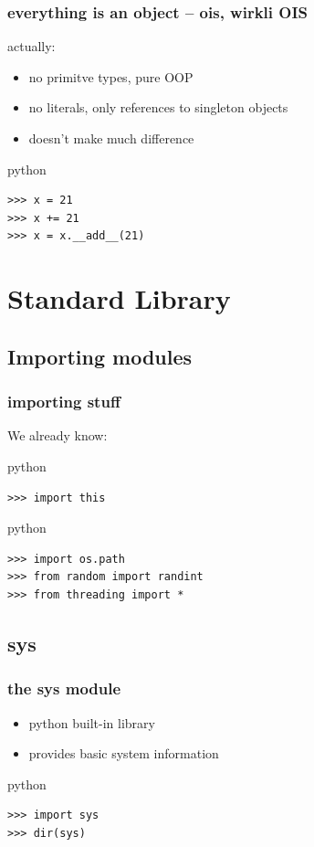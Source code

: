 \documentclass{beamer}
\begin{document}
\begin{frame}[fragile]
	\frametitle{everything is an object -- ois, wirkli OIS}
	actually:
	\begin{itemize}
	\item no primitve types, pure OOP
	\item no literals, only references to singleton objects
	\item doesn't make much difference
	\end{itemize}
	\begin{exampleblock}{python}
	\begin{lstlisting}
>>> x = 21
>>> x += 21
>>> x = x.__add__(21)
	\end{lstlisting}
	\end{exampleblock}
\end{frame}

	
\section{Standard Library}
\subsection{Importing modules}

\begin{frame}[fragile]
	\frametitle{importing stuff}
	We already know:
	\begin{exampleblock}{python}
	\begin{lstlisting}
>>> import this
	\end{lstlisting}
	\end{exampleblock}

\pause

	\begin{exampleblock}{python}
	\begin{lstlisting}
>>> import os.path
>>> from random import randint
>>> from threading import *
	\end{lstlisting}
	\end{exampleblock}
\end{frame}

\subsection{sys} 
\begin{frame}[fragile]
    \frametitle{the sys module}
    \begin{itemize}
    \item python built-in library
    \item provides basic system information
    \end{itemize}

    \begin{exampleblock}{python}
    \begin{lstlisting}
>>> import sys
>>> dir(sys)
    \end{lstlisting}
    \end{exampleblock}
\end{frame}
\end{document}

